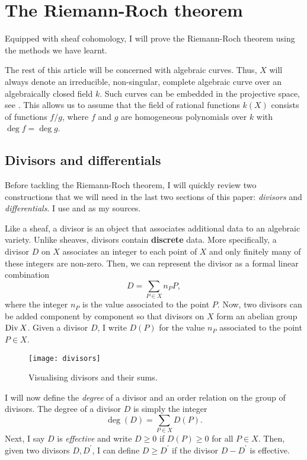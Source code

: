 \section{The Riemann-Roch theorem}
Equipped with sheaf cohomology, I will prove the Riemann-Roch theorem
using the methods we have learnt.
\begin{lnote}
  The rest of this article will be concerned with algebraic curves. Thus,
  $X$ will always denote an irreducible, non-singular, complete algebraic
  curve over an algebraically closed field $k$. Such curves can be embedded
  in the projective space, see \cite{serre}. This allows us to assume that
  the field of rational functions $k(X)$ consists of functions $f/g$, where
  $f$ and $g$ are homogeneous polynomials over $k$ with $\deg f=\deg g$.
\end{lnote}

\subsection{Divisors and differentials}
Before tackling the Riemann-Roch theorem, I will quickly review two
constructions that we will need in the last two sections of this paper:
\emph{divisors} and \emph{differentials}. I use \cite{gathmann}
and \cite{serre} as my sources.

Like a sheaf, a divisor is an object that associates additional data to
an algebraic variety. Unlike sheaves, divisors contain \textbf{discrete}
data. More specifically, a divisor $D$ on $X$ associates an integer to
each point of $X$ and only finitely many of these integers are non-zero.
Then, we can represent the divisor as a formal linear combination
\[
  D=\sum_{P\in X}n_{P}P,
\]
where the integer $n_{P}$ is the value associated to the point $P$.
Now, two divisors can be added component by component so that divisors on
$X$ form an abelian group $\operatorname{Div} X$. Given a divisor $D$, I write $D(P)$
for the value $n_{P}$ associated to the point $P\in X$.
\begin{figure}[H]
  \centering
  \texttt{[image: divisors]}
  \caption{Visualising divisors and their sums.}
\end{figure}
I will now define the \emph{degree} of a divisor and an order relation on
the group of divisors. The degree of a divisor $D$ is simply the integer
\[
  \deg(D) = \sum_{P\in X} D(P).
\]
Next, I say $D$ is \emph{effective} and write $D\geq 0$ if $D(P)\geq 0$
for all $P\in X$. Then, given two divisors $D, D^{\prime}$, I can define
$D\geq D^{\prime}$ if the divisor $D-D^{\prime}$ is effective.

